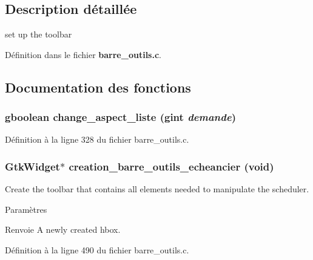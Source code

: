 \subsection{Description détaillée}
set up the toolbar 

Définition dans le fichier {\bf barre\_\-outils.c}.



\subsection{Documentation des fonctions}
\subsubsection[{change\_\-aspect\_\-liste}]{\setlength{\rightskip}{0pt plus 5cm}gboolean change\_\-aspect\_\-liste (gint {\em demande})}\label{barre__outils_8c_ae695ec2f9683a33728d94f301b83aaa9}


Définition à la ligne 328 du fichier barre\_\-outils.c.

\subsubsection[{creation\_\-barre\_\-outils\_\-echeancier}]{\setlength{\rightskip}{0pt plus 5cm}GtkWidget$\ast$ creation\_\-barre\_\-outils\_\-echeancier (void)}\label{barre__outils_8c_a9f1ea21cc01c1a429a23c478fc9ca868}
Create the toolbar that contains all elements needed to manipulate the scheduler.


\begin{DoxyParams}{Paramètres}
\item[{\em }]\end{DoxyParams}
\begin{DoxyReturn}{Renvoie}
A newly created hbox. 
\end{DoxyReturn}


Définition à la ligne 490 du fichier barre\_\-outils.c.

